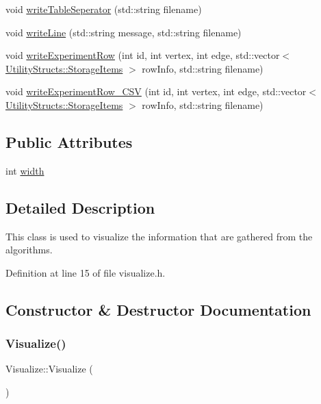 \begin{DoxyCompactItemize}
void \hyperlink{class_visualize_ac5530b8e917c748163e621cf5677eeb5}{write\+Table\+Seperator} (std\+::string filename)
\item 
void \hyperlink{class_visualize_a9ccde29aab876a829335775898373e96}{write\+Line} (std\+::string message, std\+::string filename)
\item 
void \hyperlink{class_visualize_a8aefacec622221533485db6701d1119e}{write\+Experiment\+Row} (int id, int vertex, int edge, std\+::vector$<$ \hyperlink{struct_utility_structs_1_1_storage_items}{Utility\+Structs\+::\+Storage\+Items} $>$ row\+Info, std\+::string filename)
\item 
void \hyperlink{class_visualize_a8677a063c82af1b37b94c7d3a3ca3746}{write\+Experiment\+Row\+\_\+\+C\+SV} (int id, int vertex, int edge, std\+::vector$<$ \hyperlink{struct_utility_structs_1_1_storage_items}{Utility\+Structs\+::\+Storage\+Items} $>$ row\+Info, std\+::string filename)
\end{DoxyCompactItemize}
\subsection*{Public Attributes}
\begin{DoxyCompactItemize}
\item 
int \hyperlink{class_visualize_af5ac723ad5f8fe8c4a8378bf1299cda7}{width}
\end{DoxyCompactItemize}


\subsection{Detailed Description}
This class is used to visualize the information that are gathered from the algorithms. 

Definition at line 15 of file visualize.\+h.



\subsection{Constructor \& Destructor Documentation}
\mbox{\label{class_visualize_a8d4163ad53518ec0c8a3eaec2bf2fe7b}} 
\subsubsection{\texorpdfstring{Visualize()}{Visualize()}}
{\footnotesize\ttfamily Visualize\+::\+Visualize (\begin{DoxyParamCaption}{ }\end{DoxyParamCaption})\hspace{0.3cm}{\ttfamily [inline]}}



